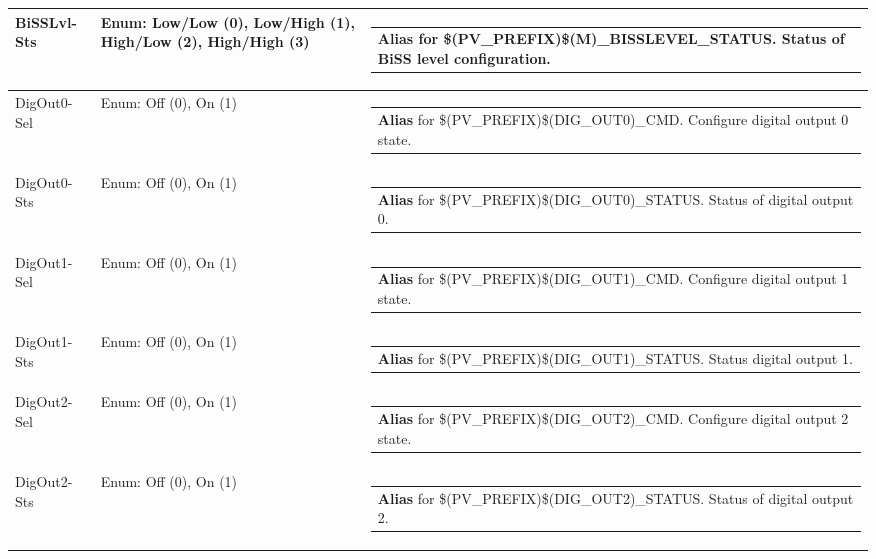 \documentclass[openany]{article}
\begin{document}
\begin{longtable}{| m{4.5cm} m{2.5cm}  m{8.5cm} |}
        BiSSLvl-Sts & Enum: Low/Low (0), Low/High (1), High/Low (2), High/High (3) & \begin{tabular}{@{}m{6cm}@{}}
                \textbf{\color{blue} Alias} for \$(PV\_PREFIX)\$(M)\_BISSLEVEL\_STATUS. Status of BiSS level configuration.
            \end{tabular} \hypertarget{pv:dig-out-0}{}\\ \hline
        DigOut0-Sel & Enum: Off (0), On (1) & \begin{tabular}{@{}m{6cm}@{}}
                \textbf{\color{blue} Alias} for \$(PV\_PREFIX)\$(DIG\_OUT0)\_CMD. Configure digital output 0 state.
            \end{tabular} \hypertarget{}{}\\ \hline
        DigOut0-Sts & Enum: Off (0), On (1) & \begin{tabular}{@{}m{6cm}@{}}
                \textbf{\color{blue} Alias} for \$(PV\_PREFIX)\$(DIG\_OUT0)\_STATUS. Status of digital output 0.
            \end{tabular} \hypertarget{pv:dig-out-1}{}\\ \hline
        DigOut1-Sel & Enum: Off (0), On (1) & \begin{tabular}{@{}m{6cm}@{}}
                \textbf{\color{blue} Alias} for \$(PV\_PREFIX)\$(DIG\_OUT1)\_CMD. Configure digital output 1 state.
            \end{tabular} \hypertarget{}{}\\ \hline
        DigOut1-Sts & Enum: Off (0), On (1) & \begin{tabular}{@{}m{6cm}@{}}
                \textbf{\color{blue} Alias} for \$(PV\_PREFIX)\$(DIG\_OUT1)\_STATUS. Status digital output 1.
            \end{tabular} \hypertarget{pv:dig-out-2}{}\\ \hline
        DigOut2-Sel & Enum: Off (0), On (1) & \begin{tabular}{@{}m{6cm}@{}}
                \textbf{\color{blue} Alias} for \$(PV\_PREFIX)\$(DIG\_OUT2)\_CMD. Configure digital output 2 state.
            \end{tabular} \hypertarget{}{}\\ \hline
        DigOut2-Sts & Enum: Off (0), On (1) & \begin{tabular}{@{}m{6cm}@{}}
                \textbf{\color{blue} Alias} for \$(PV\_PREFIX)\$(DIG\_OUT2)\_STATUS. Status of digital output 2.

\end{tabular}
\end{longtable}
\end{document}
